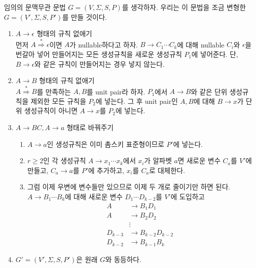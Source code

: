 \documentclass[b5paper, 10pt]{book}
\theoremstyle{definition}
\newenvironment{pf*}{\pushQED{\qed}\pf}{\popQED\endpf}
\begin{document}
\begin{pf*}
    임의의 문맥무관 문법 $G = (V, \Sigma, S, P)$를 생각하자. 우리는 이 문법을
    조금 변형한 $G = (V', \Sigma, S, P')$를 만들 것이다. 
    \begin{enumerate}
        \item $A \rightarrow \epsilon$ 형태의 규칙 없애기 \\ 
        먼저 $A \overset{*}{\Rightarrow} \epsilon$이면 $A$가 nullable하다고 하자.
        $B \rightarrow C_1 \cdots C_k$에 대해 nullable $C_i$와 $\epsilon$을
        번갈아 넣어 만들어지는 모든 생성규칙을 새로운 생성규칙 $P_1$에 넣어준다. 단, 
        $B \rightarrow \epsilon$와
        같은 규칙이 만들어지는 경우 넣지 않는다. 
        \item $A\rightarrow B$ 형태의 규칙 없애기 \\ 
        $A \overset{*}{\Rightarrow} B$를 만족하는 $A, B$를 unit pair라 하자.
        $P_1$에서 $A \rightarrow B$와 같은 단위 생성규칙을 제외한 모든 규칙을 $P_2$에 넣는다.
        그 후 unit pair인 $A, B$에 대해 $B \rightarrow x$가 단위 생성규칙이 아니면 $A \rightarrow x$를
        $P_2$에 넣는다.
        \item $A \rightarrow BC, A \rightarrow a$ 형태로 바꿔주기
        \begin{enumerate}
            \item $A \rightarrow a$인 생성규칙은 이미 촘스키 표준형이므로 $P'$에 넣는다.
            \item $r \ge 2$인 각 생성규칙 $A \rightarrow x_1 \cdots x_k$에서 $x_i$가 
            알파벳 $a$면
            새로운 변수 $C_a$를 $V'$에 만들고, $C_a \rightarrow a$를 $P'$에 
            추가하고, $x_i$를 $C_a$로 대체한다.
            \item 그럼 이제 우변에 변수들만 있으므로 이제 두 개로 줄이기만 하면 된다.
            $A \rightarrow B_1 \cdots B_k$에 대해 새로운 변수 $D_1 \cdots D_{k-2}$를 $V'$에 도입하고 
            \begin{align*}
                A & \rightarrow B_1 D_1 \\ 
                A & \rightarrow B_2 D_2 \\ 
                &\vdots \\ 
                D_{k-3} &\rightarrow B_{k-2}D_{k-2} \\ 
                D_{k-2} &\rightarrow B_{k-1}B_{k}
            \end{align*}
            
        \end{enumerate}
        \item $G'= (V', \Sigma, S, P' )$은 원래 $G$와 동등하다. 
    \end{enumerate} 
\end{pf*}
\end{document}
